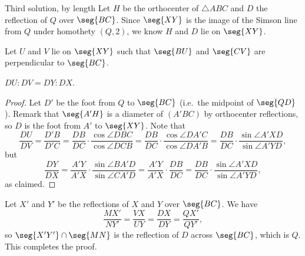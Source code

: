 \begin{customenv}{Third solution, by length}
    Let $H$ be the orthocenter of $\triangle ABC$ and $D$ the reflection of $Q$ over $\seg{BC}$. Since $\seg{XY}$ is the image of the Simson line from $Q$ under homothety $(Q,2)$, we know $H$ and $D$ lie on $\seg{XY}$.

    Let $U$ and $V$ lie on $\seg{XY}$ such that $\seg{BU}$ and $\seg{CV}$ are perpendicular to $\seg{BC}$.
    \begin{iclaim*}
        $DU:DV=DY:DX$.
    \end{iclaim*}
    \begin{proof}
        Let $D'$ be the foot from $Q$ to $\seg{BC}$ (i.e.\ the midpoint of $\seg{QD}$). Remark that $\seg{A'H}$ is a diameter of $(A'BC)$ by orthocenter reflections, so $D$ is the foot from $A'$ to $\seg{XY}$. Note that \[\frac{DU}{DV}=\frac{D'B}{D'C}=\frac{DB}{DC}\cdot\frac{\cos\angle DBC}{\cos\angle DCB}=\frac{DB}{DC}\cdot\frac{\cos\angle DA'C}{\cos\angle DA'B}=\frac{DB}{DC}\cdot\frac{\sin\angle A'XD}{\sin\angle A'YD},\]
        but \[\frac{DY}{DX}=\frac{A'Y}{A'X}\cdot\frac{\sin\angle BA'D}{\sin\angle CA'D}=\frac{A'Y}{A'X}\cdot\frac{DB}{DC}=\frac{DB}{DC}\cdot\frac{\sin\angle A'XD}{\sin\angle A'YD},\]
        as claimed.
    \end{proof}

    Let $X'$ and $Y'$ be the reflections of $X$ and $Y$ over $\seg{BC}$. We have \[\frac{MX'}{NY'}=\frac{VX}{UY}=\frac{DX}{DY}=\frac{QX'}{QY'},\]
    so $\seg{X'Y'}\cap\seg{MN}$ is the reflection of $D$ across $\seg{BC}$, which is $Q$. This completes the proof.
\end{customenv}

